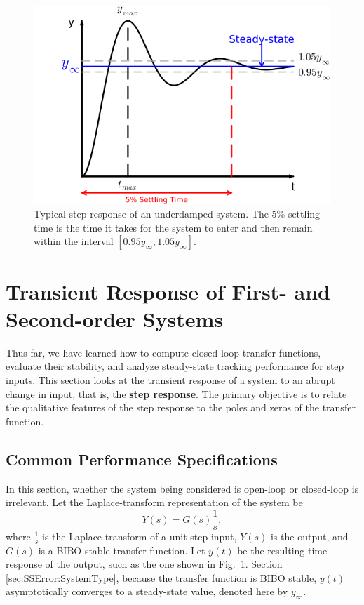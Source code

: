 \Qed

\bigskip

\begin{figure}[hbt]
	\centering
		 \includegraphics[width=0.90\linewidth]{graphics/Chap10/TypicalStepResponse.png}
	\caption{Typical step response of an underdamped system. The 5\% settling time is the time it takes for the system to enter and then remain within the interval $[0.95 y_\infty, 1.05 y_\infty]$.}
	\label{fig:TransientResponse:TypicalStep}
\end{figure}


\section{Transient Response of First- and Second-order Systems}

Thus far, we have learned how to compute closed-loop transfer functions, evaluate their stability, and analyze steady-state tracking performance for step inputs. This section looks at the transient response of a system to an abrupt change in input, that is, the \textbf{step response}. The primary objective is to relate the qualitative features of the step response to the poles and zeros of the transfer function.


\subsection{Common Performance Specifications}

In this section, whether the system being considered is open-loop or closed-loop is irrelevant. Let the Laplace-transform representation of the system be
$$Y(s)=G(s) \frac{1}{s},$$
 where  $\frac{1}{s}$ is the Laplace transform of a unit-step input, $Y(s)$ is the output, and $G(s)$ is a BIBO stable transfer function. Let $y(t)$ be the resulting time response of the output, such as the one shown in Fig.~\ref{fig:TransientResponse:TypicalStep}. Section \ref{sec:SSError:SystemType}, because the transfer function is BIBO stable, $y(t)$ asymptotically converges to a steady-state value, denoted here by $y_\infty$.

